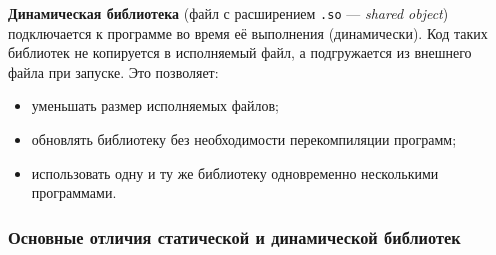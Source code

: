 \textbf{Динамическая библиотека} (файл с расширением \texttt{.so} — \textit{shared object}) подключается к программе во время её выполнения (динамически). Код таких библиотек не копируется в исполняемый файл, а подгружается из внешнего файла при запуске. Это позволяет:
\begin{itemize}[noitemsep]
  \item уменьшать размер исполняемых файлов;
  \item обновлять библиотеку без необходимости перекомпиляции программ;
  \item использовать одну и ту же библиотеку одновременно несколькими программами.
\end{itemize}

\subsubsection*{Основные отличия статической и динамической библиотек}

